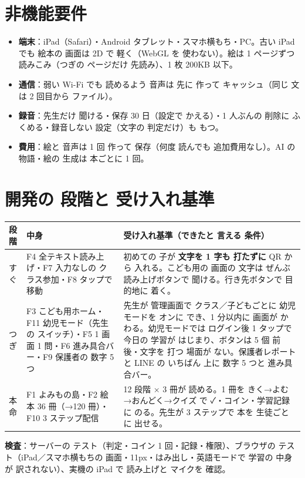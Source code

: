 \documentclass[a4paper,10pt]{article}
\begin{document}
\section{非機能要件}
\begin{itemize}
\item \textbf{端末}：iPad（Safari）・Android タブレット・スマホ横もち・PC。古い iPad でも 絵本の 画面は 2D で 軽く（WebGL を 使わない）。絵は 1 ページずつ 読みこみ（つぎの ページだけ 先読み）、1 枚 200KB 以下。
\item \textbf{通信}：弱い Wi-Fi でも 読めるよう 音声は 先に 作って キャッシュ（同じ 文は 2 回目から ファイル）。
\item \textbf{録音}：先生だけ 聞ける・保存 30 日（設定で かえる）・1 人ぶんの 削除に ふくめる・録音しない 設定（文字の 判定だけ）も もつ。
\item \textbf{費用}：絵と 音声は 1 回 作って 保存（何度 読んでも 追加費用なし）。AI の 物語・絵の 生成は 本ごとに 1 回。
\end{itemize}

\section{開発の 段階と 受け入れ基準}
\begin{longtable}{@{}L{18mm}L{72mm}L{80mm}@{}}
\toprule
\textbf{段階} & \textbf{中身} & \textbf{受け入れ基準（できたと 言える 条件）} \\ \midrule
すぐ & F4 全テキスト読み上げ・F7 入力なしの クラス参加・F8 タップで 移動 & 初めての 子が \textbf{文字を 1 字も 打たずに} QR から 入れる。こども用の 画面の 文字は ぜんぶ 読み上げボタンで 聞ける。行き先ボタンで 目的地に 着く。\\
つぎ & F3 こども用ホーム・F11 幼児モード（先生の スイッチ）・F5 1 画面 1 問・F6 進み具合バー・F9 保護者の 数字 5 つ & 先生が 管理画面で クラス／子どもごとに 幼児モードを オンに でき、1 分以内に 画面が かわる。幼児モードでは ログイン後 1 タップで 今日の 学習が はじまり、ボタンは 5 個 前後・文字を 打つ 場面が ない。保護者レポートと LINE の いちばん 上に 数字 5 つと 進み具合バー。\\
本命 & F1 よみもの島・F2 絵本 36 冊（→120 冊）・F10 3 ステップ配信 & 12 段階 × 3 冊が 読める。1 冊を きく→よむ→おんどく→クイズ で ✓・コイン・学習記録に のる。先生が 3 ステップで 本を 生徒ごとに 出せる。\\
\bottomrule
\end{longtable}
\textbf{検査}：サーバーの テスト（判定・コイン 1 回・記録・権限）、ブラウザの テスト（iPad／スマホ横もちの 画面・11px・はみ出し・英語モードで 学習の 中身が 訳されない）、実機の iPad で 読み上げと マイクを 確認。
\end{document}
